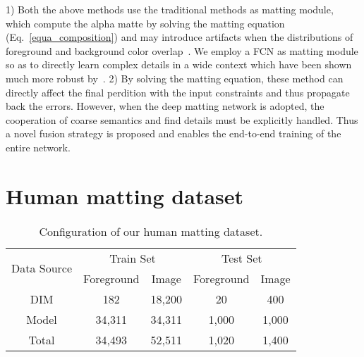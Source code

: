 1) Both the above methods use the traditional methods as matting module, which compute the alpha matte by solving the matting equation (Eq.~\ref{equa_composition}) and may introduce artifacts when the distributions of foreground and background color overlap~\cite{xu2017deep}.
We employ a FCN as matting module so as to directly learn complex details in a wide context which have been shown much more robust by~\cite{xu2017deep}.
2) By solving the matting equation, these method can directly affect the final perdition with the input constraints and thus propagate back the errors.
However, when the deep matting network is adopted, the cooperation of coarse semantics and find details must be explicitly handled.
Thus a novel fusion strategy is proposed and enables the end-to-end training of the entire network.




























\section{Human matting dataset}\label{dataset}


\begin{table}[t]
\caption{Configuration of our human matting dataset.}
\centering
\begin{tabular}{c cc cc}
\toprule
   \multirow{2}{*}{Data Source}  & \multicolumn{2}{c}{Train Set}  & \multicolumn{2}{c}{Test Set} \\
             &   Foreground         & Image  &   Foreground    & Image \\ \midrule
   DIM\cite{xu2017deep} &  182        & 18,200      &   20    & 400   \\
   Model                &  34,311      & 34,311      &   1,000  & 1,000  \\
   Total                &  34,493      & 52,511      &   1,020  & 1,400  \\ \bottomrule

\end{tabular}
\label{tab:dataset_config}
\end{table}




